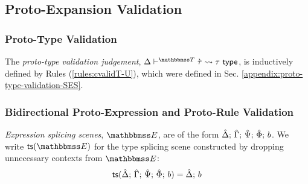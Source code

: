 \subsection{Proto-Expansion Validation}\label{appendix:proto-expansion-validation-BS}
\subsubsection{Proto-Type Validation}
The \emph{proto-type validation judgement}, $\cvalidT{\Delta}{\tscenev}{\ctau}{\tau}$, is inductively defined by Rules (\ref{rules:cvalidT-U}), which were defined in Sec. \ref{appendix:proto-type-validation-SES}.

\subsubsection{Bidirectional Proto-Expression and Proto-Rule Validation}
\emph{Expression splicing scenes}, $\escenev$, are of the form $\hat{\Delta};\,\hat{\Gamma};\,\hat{\Psi};\,\hat\Phi;\,b$. We write $\tsfrom{\escenev}$ for the type splicing scene constructed by dropping unnecessary contexts from $\escenev$:
\[\mathsf{ts}(\hat{\Delta};\,\hat{\Gamma};\,\hat{\Psi};\,\hat\Phi;\,b) = \hat{\Delta};\,b\]

